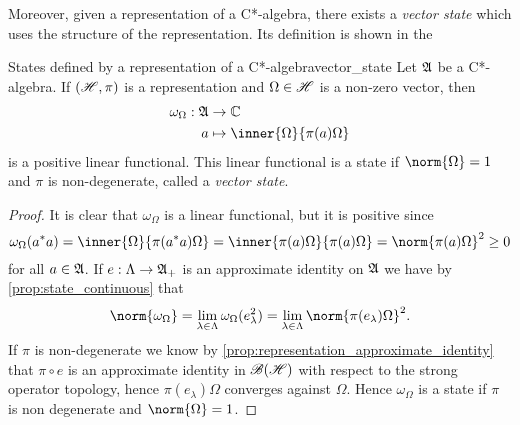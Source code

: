 Moreover, given a representation of a C*-algebra, there exists a \emph{vector state} which uses the structure of the representation. Its definition is shown in the
\begin{proposition}{States defined by a representation of a C*-algebra}{vector_state}
    Let \(\mathfrak{A}\) be a C*-algebra. If \((\mathscr{H}, \pi)\) is a representation and \(\Omega \in \mathscr{H}\) is a non-zero vector, then
    \begin{align*}
        \omega_{\Omega} : \algebra{A} &\to \mathbb{C}\\
                                    a &\mapsto \inner{\Omega}{\pi(a)\Omega}
    \end{align*}
    is a positive linear functional. This linear functional is a state if \(\norm{\Omega} = 1\) and \(\pi\) is non-degenerate, called a \emph{vector state}. 
\end{proposition}
\begin{proof}
    It is clear that \(\omega_{\Omega}\) is a linear functional, but it is positive since
    \begin{equation*}
        \omega_{\Omega}(a^*a) = \inner{\Omega}{\pi(a^*a)\Omega} = \inner{\pi(a)\Omega}{\pi(a)\Omega} = \norm{\pi(a)\Omega}^2 \geq 0
    \end{equation*}
    for all \(a \in \mathfrak{A}\). If \(e : \Lambda \to \mathfrak{A}_+\) is an approximate identity on \(\mathfrak{A}\) we have by \cref{prop:state_continuous} that
    \begin{equation*}
        \norm{\omega_\Omega} = \lim_{\lambda \in \Lambda}{\omega_\Omega(e_\lambda^2)} = \lim_{\lambda \in \Lambda}{\norm{\pi(e_{\lambda})\Omega}^2}.
    \end{equation*}
    If \(\pi\) is non-degenerate we know by \cref{prop:representation_approximate_identity} that \(\pi \circ e\) is an approximate identity in \(\mathscr{B}(\mathscr{H})\) with respect to the strong operator topology, hence \(\pi(e_\lambda)\Omega\) converges against \(\Omega\). Hence \(\omega_\Omega\) is a state if \(\pi\) is non degenerate and \(\norm{\Omega} = 1\).
\end{proof}

